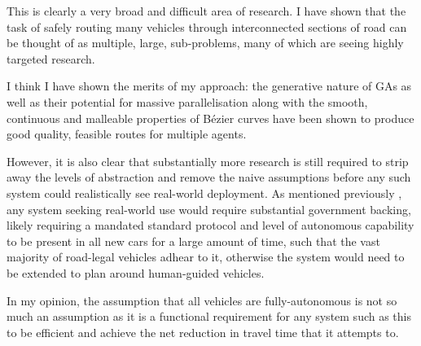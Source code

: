 
This is clearly a very broad and difficult area of research. I have shown that the task of safely routing many vehicles through interconnected sections of road can be thought of as multiple, large, sub-problems, many of which are seeing highly targeted research.

I think I have shown the merits of my approach: the generative nature of GAs as well as their potential for massive parallelisation along with the smooth, continuous and malleable properties of Bézier curves have been shown to produce good quality, feasible routes for multiple agents.

However, it is also clear that substantially more research is still required to strip away the levels of abstraction and remove the naive assumptions before any such system could realistically see real-world deployment. As mentioned previously , any system seeking real-world use would require substantial government backing, likely requiring a mandated standard protocol and level of autonomous capability to be present in all new cars for a large amount of time, such that the vast majority of road-legal vehicles adhear to it, otherwise the system would need to be extended to plan around human-guided vehicles.

In my opinion, the assumption that all vehicles are fully-autonomous is not so much an assumption as it is a functional requirement for any system such as this to be efficient and achieve the net reduction in travel time that it attempts to.



